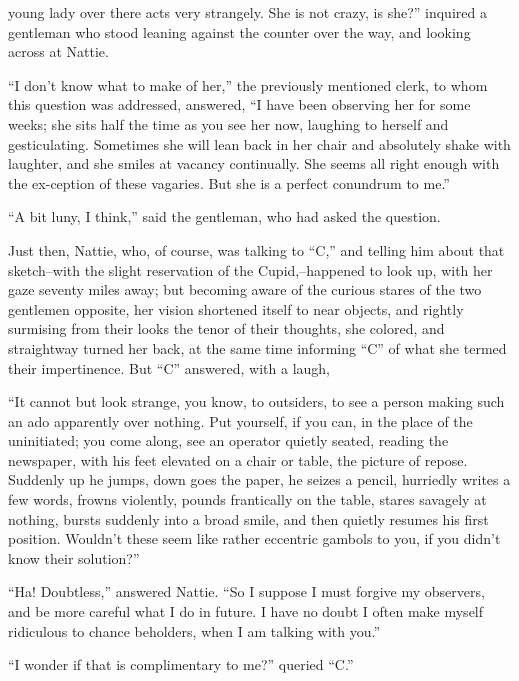 

 young lady over there acts very strangely. She is not crazy, is
she?'' inquired a gentleman who stood leaning against the counter over
the way, and looking across at Nattie.

``I don't know what to make of her,'' the previously mentioned clerk, to
whom this question was addressed, answered, ``I have been observing her
for some weeks; she sits half the time as you see her now, laughing to
herself and gesticulating. Sometimes she will lean back in her chair and
absolutely shake with laughter, and she smiles at vacancy continually.
She seems all right enough with the ex-ception of these vagaries. But
she is a perfect conundrum to me.''

``A bit luny, I think,'' said the gentleman, who had asked the question.

Just then, Nattie, who, of course, was talking to ``C,'' and telling him
about that sketch--with the slight reservation of the Cupid,--happened
to look up, with her gaze seventy miles away; but becoming aware of the
curious stares of the two gentlemen opposite, her vision shortened
itself to near objects, and rightly surmising from their looks the tenor
of their thoughts, she colored, and straightway turned her back, at the
same time informing ``C'' of what she termed their impertinence. But ``C''
answered, with a laugh,

``It cannot but look strange, you know, to outsiders, to see a person
making such an ado apparently over nothing. Put yourself, if you can, in
the place of the uninitiated; you come along, see an operator quietly
seated, reading the newspaper, with his feet elevated on a chair or
table, the picture of repose. Suddenly up he jumps, down goes the paper,
he seizes a pencil, hurriedly writes a few words, frowns violently,
pounds frantically on the table, stares savagely at nothing, bursts
suddenly into a broad smile, and then quietly resumes his first
position. Wouldn't these seem like rather eccentric gambols to you, if
you didn't know their solution?''

``Ha! Doubtless,'' answered Nattie. ``So I suppose I must forgive my
observers, and be more careful what I do in future. I have no doubt I
often make myself ridiculous to chance beholders, when I am talking with
you.''

``I wonder if that is complimentary to me?'' queried ``C.''

